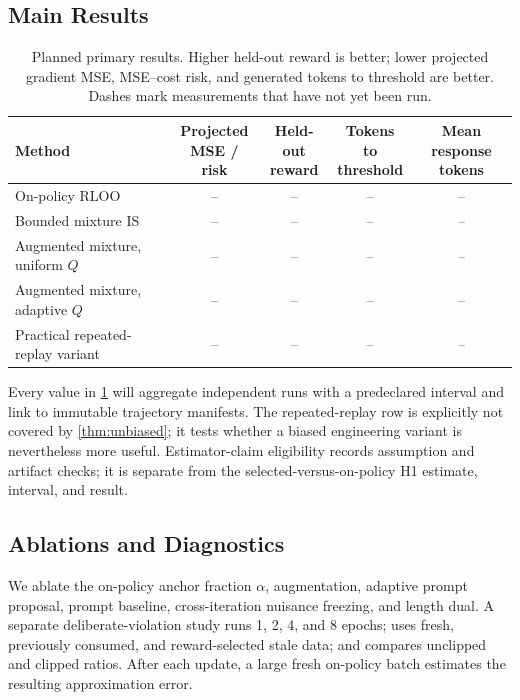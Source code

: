 \documentclass{article}
\begin{document}
\subsection{Main Results}

\begin{table}[t]
\caption{Planned primary results. Higher held-out reward is better;
lower projected gradient MSE, MSE--cost risk, and generated tokens to threshold are better.
Dashes mark measurements that have not yet been run.}
\label{tab:main}
\centering
\begin{small}
\begin{tabular}{lcccc}
\toprule
Method & \shortstack{Projected\\MSE / risk}
& \shortstack{Held-out\\reward}
& \shortstack{Tokens to\\threshold}
& \shortstack{Mean response\\tokens} \\
\midrule
On-policy RLOO & -- & -- & -- & -- \\
Bounded mixture IS & -- & -- & -- & -- \\
Augmented mixture, uniform $Q$ & -- & -- & -- & -- \\
Augmented mixture, adaptive $Q$ & -- & -- & -- & -- \\
Practical repeated-replay variant & -- & -- & -- & -- \\
\bottomrule
\end{tabular}
\end{small}
\end{table}

Every value in \cref{tab:main} will aggregate independent runs with a
predeclared interval and link to immutable trajectory manifests. The
repeated-replay row is explicitly not covered by \cref{thm:unbiased}; it tests
whether a biased engineering variant is nevertheless more useful.
Estimator-claim eligibility records assumption and artifact checks; it is
separate from the selected-versus-on-policy H1 estimate, interval, and result.

\subsection{Ablations and Diagnostics}

We ablate the on-policy anchor fraction $\alpha$, augmentation, adaptive prompt
proposal, prompt baseline, cross-iteration nuisance freezing, and length dual.
A separate deliberate-violation study runs 1, 2, 4, and 8 epochs; uses fresh,
previously consumed, and reward-selected stale data; and compares unclipped and
clipped ratios. After each update, a large fresh on-policy batch estimates the
resulting approximation error.
\end{document}
